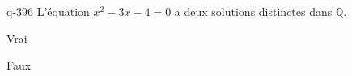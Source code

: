\begin{truefalse}{q-396}
L'équation $x^2-3x-4=0$ a deux solutions distinctes dans $\mathbb Q$.
\item* Vrai
\item Faux
\end{truefalse}

